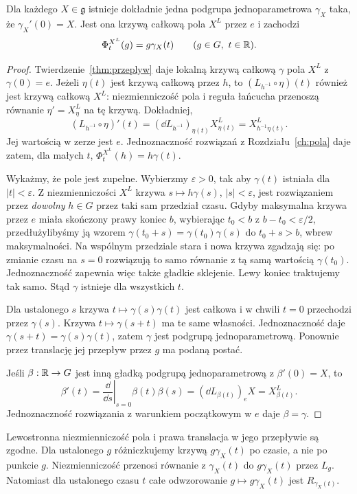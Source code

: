 \begin{twierdzenie}
\label{thm:one-param-lie}
Dla każdego $X\in\mathfrak g$ istnieje dokładnie jedna
podgrupa jednoparametrowa $\gamma_X$ taka, że
$\gamma_X'(0)=X$. Jest ona krzywą całkową pola $X^L$
przez $e$ i zachodzi
\[
 \Phi_t^{X^L}(g)=g\gamma_X(t)
 \qquad (g\in G,\ t\in\mathbb{R}).
\]
\end{twierdzenie}
\begin{proof}
Twierdzenie~\ref{thm:przeplyw} daje lokalną krzywą
całkową $\gamma$ pola $X^L$ z $\gamma(0)=e$.
Jeżeli $\eta(t)$ jest krzywą całkową przez $h$, to
$(L_{h^{-1}}\circ\eta)(t)$ również jest krzywą całkową $X^L$:
niezmienniczość pola i reguła łańcucha przenoszą równanie
$\eta'=X^L_\eta$ na tę krzywą. Dokładniej,
\[
 (L_{h^{-1}}\circ\eta)'(t)
 =(\dd L_{h^{-1}})_{\eta(t)}X^L_{\eta(t)}
 =X^L_{h^{-1}\eta(t)}.
\]
Jej wartością w zerze jest $e$. Jednoznaczność rozwiązań
z Rozdziału~\ref{ch:pola} daje zatem, dla małych $t$,
$\Phi_t^{X^L}(h)=h\gamma(t)$.

Wykażmy, że pole jest zupełne. Wybierzmy $\varepsilon>0$,
tak aby $\gamma(t)$ istniała dla $|t|<\varepsilon$.
Z niezmienniczości $X^L$ krzywa
$s\mapsto h\gamma(s)$, $|s|<\varepsilon$, jest
rozwiązaniem przez \emph{dowolny} $h\in G$ przez taki sam
przedział czasu. Gdyby maksymalna krzywa przez $e$ miała
skończony prawy koniec $b$, wybierając $t_0<b$ z
$b-t_0<\varepsilon/2$, przedłużylibyśmy ją wzorem
$\gamma(t_0+s)=\gamma(t_0)\gamma(s)$ do
$t_0+s>b$, wbrew maksymalności.
Na wspólnym przedziale stara i nowa krzywa zgadzają się:
po zmianie czasu na $s=0$ rozwiązują to samo równanie
z tą samą wartością $\gamma(t_0)$. Jednoznaczność
zapewnia więc także gładkie sklejenie. Lewy koniec traktujemy
tak samo. Stąd $\gamma$ istnieje dla wszystkich $t$.

Dla ustalonego $s$ krzywa $t\mapsto\gamma(s)\gamma(t)$
jest całkowa i w chwili $t=0$ przechodzi przez
$\gamma(s)$. Krzywa $t\mapsto\gamma(s+t)$ ma te same
własności. Jednoznaczność daje
$\gamma(s+t)=\gamma(s)\gamma(t)$, zatem $\gamma$ jest
podgrupą jednoparametrową. Ponownie przez translację
jej przepływ przez $g$ ma podaną postać.

Jeśli $\beta:\mathbb{R}\to G$ jest inną gładką podgrupą
jednoparametrową z $\beta'(0)=X$, to
\[
 \beta'(t)=\left.\frac{\dd}{\dd s}\right|_{s=0}
 \beta(t)\beta(s)=(\dd L_{\beta(t)})_eX=X^L_{\beta(t)}.
\]
Jednoznaczność rozwiązania z warunkiem początkowym w $e$
daje $\beta=\gamma$.
\end{proof}

Lewostronna niezmienniczość pola i prawa translacja w jego
przepływie są zgodne. Dla ustalonego $g$ różniczkujemy
krzywą $g\gamma_X(t)$ po czasie, a nie po punkcie $g$.
Niezmienniczość przenosi równanie z $\gamma_X(t)$ do
$g\gamma_X(t)$ przez $L_g$. Natomiast dla ustalonego czasu
$t$ całe odwzorowanie $g\mapsto g\gamma_X(t)$ jest
$R_{\gamma_X(t)}$.

